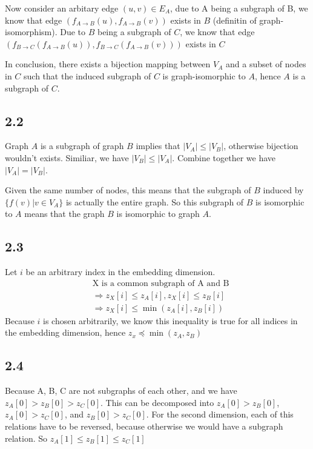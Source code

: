 \documentclass{article}
\begin{document}
Now consider an arbitary edge $(u,v) \in E_A$, due to A being a subgraph of B, we know that edge $(f_{A\to B}(u), f_{A\to B}(v))$ exists in $B$ (definitin of graph-isomorphism). Due to $B$ being a subgraph of $C$, we know that edge $(f_{B \to C}(f_{A\to B}(u)), f_{B \to C}(f_{A\to B}(v)))$ exists in $C$\\ \par

In conclusion, there exists a bijection mapping between $V_A$ and a subset of nodes in $C$ such that the induced subgraph of $C$ is graph-isomorphic to $A$, hence $A$ is a subgraph of $C$. 


\subsection*{2.2}
Graph $A$ is a subgraph of graph $B$ implies that $|V_A| \leq |V_B|$, otherwise bijection wouldn't exists. Similiar, we have $|V_B| \leq |V_A|$. Combine together we have $|V_A| = |V_B|$. \\ \par

Given the same number of nodes, this means that the subgraph of $B$ induced by $\{ f(v) | v\in V_A \}$ is actually the entire graph. So this subgraph of $B$ is isomorphic to $A$ means that the graph $B$ is isomorphic to graph $A$. 


\subsection*{2.3}
Let $i$ be an arbitrary index in the embedding dimension. 
    \begin{align*}
        & \textrm{X is a common subgraph of A and B} \\
        & \Longrightarrow z_X[i] \leq z_A[i], z_X[i] \leq z_B[i]\\
        & \Longrightarrow z_X[i] \leq \min(z_A[i], z_B[i])
    \end{align*}
Because $i$ is chosen arbitrarily, we know this inequality is true for all indices in the embedding dimension, hence $z_x  \preccurlyeq \min(z_A, z_B)$


\subsection*{2.4}
Because A, B, C are not subgraphs of each other, and we have $z_A[0] > z_B[0] > z_C[0]$. This can be decomposed into $z_A[0] > z_B[0]$,  $z_A[0] > z_C[0]$, and  $z_B[0] > z_C[0]$. For the second dimension, each of this relations have to be reversed, because otherwise we would have a subgraph relation. So 
$z_A[1] \leq z_B[1] \leq z_C[1]$
\end{document}
